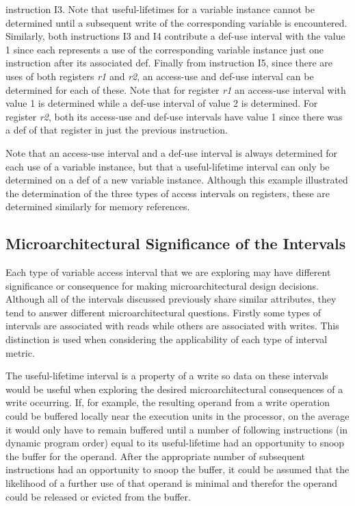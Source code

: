 \documentclass[10pt,dvips]{article}
\begin{document}
instruction I3.
Note that useful-lifetimes for a variable instance
cannot be determined until a subsequent
write of the corresponding variable is encountered.
Similarly, both instructions I3 and I4 contribute a def-use interval
with the value 1 since each represents a use of the corresponding
variable instance just one instruction after its associated def.
Finally from instruction I5, since there are uses of both registers
\textit{r1} and \textit{r2}, an access-use and def-use interval
can be determined for each of these.
Note that for register \textit{r1} an access-use interval with value
1 is determined while a def-use interval of value 2 is determined.
For register \textit{r2}, both its access-use and def-use intervals
have value 1 since there was a def of that register in just
the previous instruction.

Note that an access-use interval and a def-use interval is always 
determined for each
use of a variable instance, but that a useful-lifetime interval can
only be determined on a def of a new variable instance.
Although this example illustrated the determination of
the three types of access intervals on registers, these are
determined similarly for memory references.
%
\subsection{Microarchitectural Significance of the Intervals}
%
Each type of variable access interval that we are exploring
may have different significance or consequence 
for making microarchitectural design decisions.
Although all of the intervals discussed previously share
similar attributes, they tend to answer different microarchitectural
questions.
Firstly some types of intervals are associated with reads
while others are associated with writes.
This distinction is used when considering the applicability of each
type of interval metric.

The useful-lifetime interval is a property of a write
so data on these intervals would be useful when exploring
the desired microarchitectural consequences of a write occurring.
If, for example, the resulting operand from a write operation
could be buffered locally near the execution units in the processor,
on the average it would only have to remain buffered until
a number of following instructions (in dynamic program order)
equal to its
useful-lifetime had an opportunity to snoop the buffer for the
operand.
After the appropriate number of subsequent instructions had an 
opportunity to snoop the buffer, it could be assumed that
the likelihood of a further use of that operand is minimal
and therefor the operand could be released or evicted from the
buffer.
\end{document}
